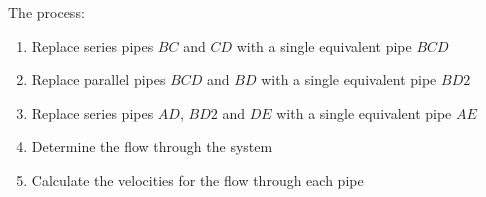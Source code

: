 \documentclass[9pt,xcolor={svgnames, x11names},mathpazo, professionalfonts]{beamer}
\begin{document}
\begin{frame}{}
	\small
	
\end{frame}
%
%
\begin{frame}
	\vspace{-0.75cm}
	\vspace{-0.75cm}
	\pause
	
	The process:
	\begin{enumerate}
		\item Replace series pipes $BC$ and $CD$ with a single equivalent pipe $BCD$
		\item Replace parallel pipes $BCD$ and $BD$ with a single equivalent pipe $BD2$
		\item Replace series pipes $AD$, $BD2$ and $DE$ with a single equivalent pipe $AE$
		\item Determine the flow through the system
		\item Calculate the velocities for the flow through each pipe
	\end{enumerate}
	
\end{frame}

\end{document}
